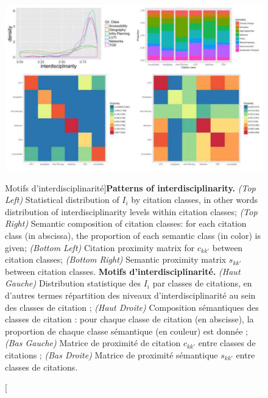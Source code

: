 \begin{figure}
\includegraphics[width=\linewidth]{Figures/Final/2-2-2-fig-quantepistemo-interdisc.jpg}
\caption[Patterns of interdisciplinarity][Motifs d'interdisciplinarité]{\textbf{Patterns of interdisciplinarity.} \textit{(Top Left)} Statistical distribution of $I_i$ by citation classes, in other words distribution of interdisciplinarity levels within citation classes; \textit{(Top Right)} Semantic composition of citation classes: for each citation class (in abscissa), the proportion of each semantic class (in color) is given; \textit{(Bottom Left)} Citation proximity matrix for $c_{kk'}$ between citation classes; \textit{(Bottom Right)} Semantic proximity matrix $s_{kk'}$ between citation classes. \label{fig:quantepistemo:interdisc}}{\textbf{Motifs d'interdisciplinarité.} \textit{(Haut Gauche)} Distribution statistique des $I_i$ par classes de citations, en d'autres termes répartition des niveaux d'interdisciplinarité au sein des classes de citation ; \textit{(Haut Droite)} Composition sémantiques des classes de citation : pour chaque classe de citation (en abscisse), la proportion de chaque classe sémantique (en couleur) est donnée ; \textit{(Bas Gauche)} Matrice de proximité de citation $c_{kk'}$ entre classes de citations ; \textit{(Bas Droite)} Matrice de proximité sémantique $s_{kk'}$ entre classes de citations.\label{fig:quantepistemo:interdisc}}
\end{figure}



